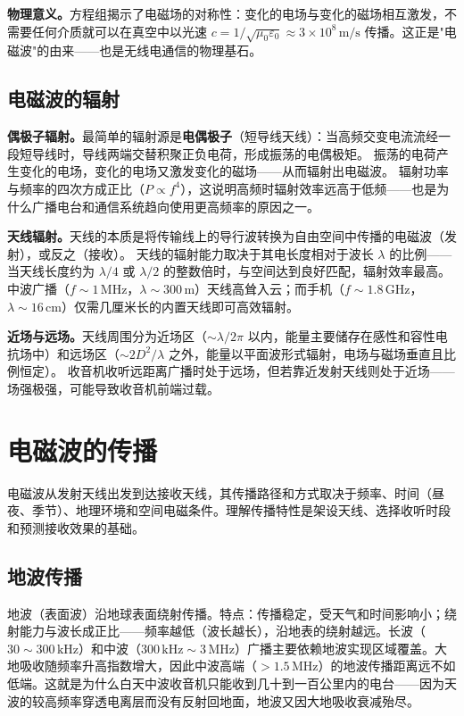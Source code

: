 \documentclass[12pt,UTF8]{ctexbook}
\begin{document}
\textbf{物理意义。}方程组揭示了电磁场的对称性：变化的电场与变化的磁场相互激发，不需要任何介质就可以在真空中以光速 $c = 1/\sqrt{\mu_0\varepsilon_0} \approx 3\times 10^8\,\mathrm{m/s}$ 传播。这正是"电磁波"的由来——也是无线电通信的物理基石。

\subsection{电磁波的辐射}

\textbf{偶极子辐射。}最简单的辐射源是\textbf{电偶极子}（短导线天线）：当高频交变电流流经一段短导线时，导线两端交替积聚正负电荷，形成振荡的电偶极矩。
振荡的电荷产生变化的电场，变化的电场又激发变化的磁场——从而辐射出电磁波。
辐射功率与频率的四次方成正比（$P \propto f^4$），这说明高频时辐射效率远高于低频——也是为什么广播电台和通信系统趋向使用更高频率的原因之一。

\textbf{天线辐射。}天线的本质是将传输线上的导行波转换为自由空间中传播的电磁波（发射），或反之（接收）。
天线的辐射能力取决于其电长度相对于波长 $\lambda$ 的比例——当天线长度约为 $\lambda/4$ 或 $\lambda/2$ 的整数倍时，与空间达到良好匹配，辐射效率最高。
中波广播（$f\sim 1\,\mathrm{MHz}$，$\lambda\sim 300\,\mathrm{m}$）天线高耸入云；而手机（$f\sim 1.8\,\mathrm{GHz}$，$\lambda\sim 16\,\mathrm{cm}$）仅需几厘米长的内置天线即可高效辐射。

\textbf{近场与远场。}天线周围分为近场区（$\sim \lambda/2\pi$ 以内，能量主要储存在感性和容性电抗场中）和远场区（$\sim 2D^2/\lambda$ 之外，能量以平面波形式辐射，电场与磁场垂直且比例恒定）。
收音机收听远距离广播时处于远场，但若靠近发射天线则处于近场——场强极强，可能导致收音机前端过载。

\section{电磁波的传播}
\label{sec:wave_propagation}

电磁波从发射天线出发到达接收天线，其传播路径和方式取决于频率、时间（昼夜、季节）、地理环境和空间电磁条件。理解传播特性是架设天线、选择收听时段和预测接收效果的基础。

\subsection{地波传播}

地波（表面波）沿地球表面绕射传播。特点：传播稳定，受天气和时间影响小；绕射能力与波长成正比——频率越低（波长越长），沿地表的绕射越远。长波（$30\sim300\,\mathrm{kHz}$）和中波（$300\,\mathrm{kHz}\sim3\,\mathrm{MHz}$）广播主要依赖地波实现区域覆盖。大地吸收随频率升高指数增大，因此中波高端（$>1.5\,\mathrm{MHz}$）的地波传播距离远不如低端。这就是为什么白天中波收音机只能收到几十到一百公里内的电台——因为天波的较高频率穿透电离层而没有反射回地面，地波又因大地吸收衰减殆尽。
\end{document}
